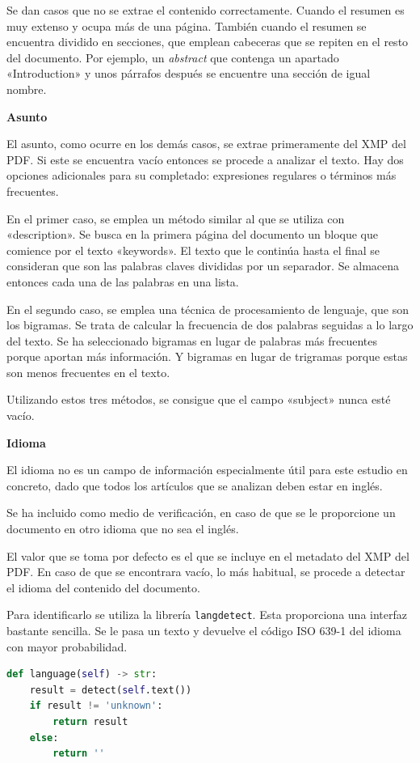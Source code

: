 \documentclass[../main.tex]{subfiles}
\begin{document}
Se dan casos que no se extrae el contenido correctamente. Cuando el resumen es muy extenso y ocupa más de una página. También cuando el resumen se encuentra dividido en secciones, que emplean cabeceras que se repiten en el resto del documento. Por ejemplo, un \textit{abstract} que contenga un apartado «Introduction» y unos párrafos después se encuentre una sección de igual nombre.

\textbf{Asunto}

El asunto, como ocurre en los demás casos, se extrae primeramente del XMP del PDF. Si este se encuentra vacío entonces se procede a analizar el texto. Hay dos opciones adicionales para su completado: expresiones regulares o términos más frecuentes.

En el primer caso, se emplea un método similar al que se utiliza con «description». Se busca en la primera página del documento un bloque que comience por el texto «keywords». El texto que le continúa hasta el final se consideran que son las palabras claves divididas por un separador. Se almacena entonces cada una de las palabras en una lista.

En el segundo caso, se emplea una técnica de procesamiento de lenguaje, que son los bigramas. Se trata de calcular la frecuencia de dos palabras seguidas a lo largo del texto. Se ha seleccionado bigramas en lugar de palabras más frecuentes porque aportan más información. Y bigramas en lugar de trigramas porque estas son menos frecuentes en el texto.

Utilizando estos tres métodos, se consigue que el campo «subject» nunca esté vacío.

\textbf{Idioma}

El idioma no es un campo de información especialmente útil para este estudio en concreto, dado que todos los artículos que se analizan deben estar en inglés.

Se ha incluido como medio de verificación, en caso de que se le proporcione un documento en otro idioma que no sea el inglés.

El valor que se toma por defecto es el que se incluye en el metadato del XMP del PDF. En caso de que se encontrara vacío, lo más habitual, se procede a detectar el idioma del contenido del documento.

Para identificarlo se utiliza la librería \texttt{langdetect}. Esta proporciona una interfaz bastante sencilla. Se le pasa un texto y devuelve el código ISO 639-1 del idioma con mayor probabilidad.

\begin{lstlisting}[language=Python]
def language(self) -> str:
    result = detect(self.text())
    if result != 'unknown':
        return result
    else:
        return ''
\end{lstlisting}
\end{document}
